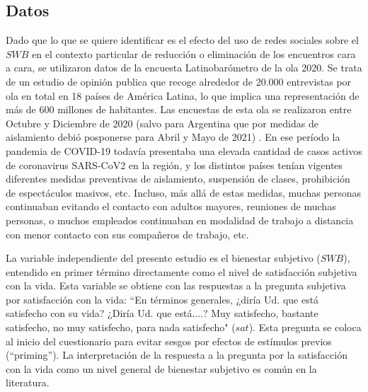 \documentclass[11pt]{article}
\begin{document}
\subsection{Datos}
Dado que lo que se quiere identificar es el efecto del uso de redes sociales sobre el $SWB$ en el contexto particular de reducción o eliminación de los encuentros cara a cara, se utilizaron datos de la encuesta Latinobarómetro de la ola 2020. Se trata de un estudio de opinión publica que recoge alrededor de 20.000 entrevistas por ola en total en 18 países de América Latina, lo que implica una representación de más de 600 millones de habitantes. Las encuestas de esta ola se realizaron entre Octubre y Diciembre de 2020 (salvo para Argentina que por medidas de aislamiento debió posponerse para Abril y Mayo de 2021) \cite{Latinobarometro2020a, Latinobarometro2020}. En ese período la pandemia de COVID-19 todavía presentaba una elevada cantidad de casos activos de coronavirus SARS-CoV2 en la región, y los distintos países tenían vigentes diferentes medidas preventivas de aislamiento, suspensión de clases, prohibición de espectáculos masivos, etc. Incluso, más allá de estas medidas, muchas personas continuaban evitando el contacto con adultos mayores, reuniones de muchas personas, o muchos empleados continuaban en modalidad de trabajo a distancia con menor contacto con sus compañeros de trabajo, etc.  

La variable independiente del presente estudio es el bienestar subjetivo ($SWB$), entendido en primer término directamente como el nivel de satisfacción subjetiva con la vida. Esta variable  se obtiene con las respuestas a la pregunta subjetiva por satisfacción con la vida: ``En términos generales, ¿diría Ud. que está satisfecho con su vida? ¿Diría Ud. que está....? Muy satisfecho, bastante satisfecho, no muy satisfecho, para nada satisfecho" ($sat$). Esta pregunta se coloca al inicio del cuestionario para evitar sesgos por efectos de estímulos previos (``priming''). La interpretación de la respuesta a la pregunta por la satisfacción con la vida como un nivel general de bienestar subjetivo es común en la literatura. 
\end{document}

